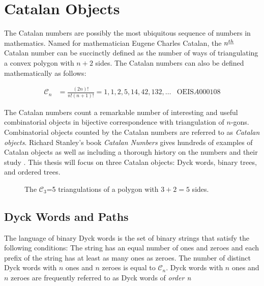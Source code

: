 \chapter{Catalan Objects}
The Catalan numbers are possibly the most ubiquitous sequence of numbers in mathematics.  
Named for mathematician Eugene Charles Catalan, the $n^{\underline{th}}$ Catalan number can be succinctly defined as the number of ways of triangulating a convex polygon with $n+2$ sides.  The Catalan numbers can also be defined mathematically as follows:

\begin{align}
    \mathcal{C}_n &= \frac{(2n)!}{n!(n+1)!} =1, 1, 2, 5, 14, 42, 132, \ldots & \text{OEIS} A000108
\end{align}

The Catalan numbers count a remarkable number of interesting and useful combinatorial objects in bijective correspondence with triangulation of $n$-gons. Combinatorial objects counted by the Catalan numbers are referred to as \emph{Catalan objects}.   Richard Stanley's book \emph{Catalan Numbers} gives hundreds of examples of Catalan objects  as well as including a thorough history on the numbers and their study \cite{stanley2015catalan}. This thesis will focus on three Catalan objects: Dyck words, binary trees, and ordered trees. 

\begin{figure}[H]
\begin{center}
\end{center}
    \caption{The $\mathcal{C}_3$=5 triangulations of a polygon with $3+2=5$ sides.}
\label{fig:}
\end{figure}

\section{Dyck Words and Paths}
The language of binary Dyck words is the set of binary strings that satisfy the following conditions: The string has an equal number of ones and zeroes and each prefix of the string has at least as many ones as zeroes.  The number of distinct Dyck words with $n$ ones and $n$ zeroes is equal to $\mathcal{C}_n$.  Dyck words with $n$ ones and $n$ zeroes are frequently referred to as Dyck words of \emph{order n}

